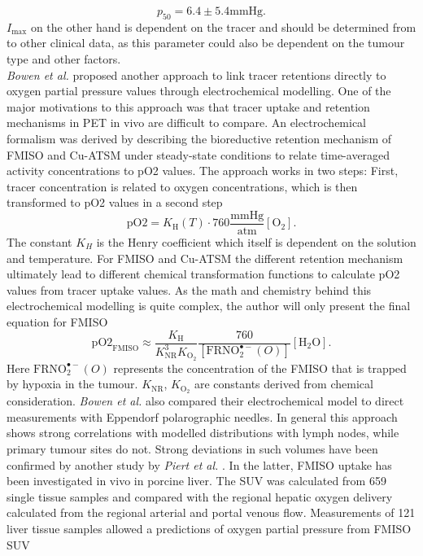 \begin{equation}
p_\mathrm{50} = 6.4 \pm 5.4 \mathrm{mmHg}.
\end{equation}
$I_\mathrm{max}$ on the other hand is dependent on the tracer and should be determined from to other clinical data, as this parameter could also be dependent on the tumour type and other factors.\\\textit{Bowen et al.} \cite{pmid21843774} proposed another approach to link tracer retentions directly to oxygen partial pressure values through electrochemical modelling. One of the major motivations to this approach was that tracer uptake and retention mechanisms in PET in vivo are difficult to compare. An electrochemical formalism was derived by describing the bioreductive retention mechanism of FMISO and Cu-ATSM under steady-state conditions to relate time-averaged activity concentrations to pO2 values. The approach works in two steps: First, tracer concentration is related to oxygen concentrations, which is then transformed to pO2 values in a second step
\begin{equation}
\mathrm{pO2} = K_\mathrm{H}(T)\cdot 760 \frac{\mathrm{mmHg}}{\mathrm{atm}}[\mathrm{O}_2].
\end{equation}
The constant $K_H$ is the Henry coefficient which itself is dependent on the solution and temperature.  For FMISO and Cu-ATSM the different retention mechanism ultimately lead to different chemical transformation functions to calculate pO2 values from tracer uptake values. As the math and chemistry behind this electrochemical modelling is quite complex, the author will only present the final equation for FMISO
\begin{equation}
\mathrm{pO2}_\mathrm{FMISO} \approx \frac{K_\mathrm{H}}{K_\mathrm{NR}^3K_{\mathrm{O}_2}}\frac{760}{[\mathrm{FRNO}_2^{\bullet -}(O)]}[\mathrm{H}_2\mathrm{O}].
\end{equation}
Here $\mathrm{FRNO}_2^{\bullet -}(O)$ represents the concentration of the FMISO that is trapped by hypoxia in the tumour. $K_\mathrm{NR}$, $K_{\mathrm{O}_2}$ are constants derived from chemical consideration. \textit{Bowen et al.} also compared their electrochemical model to direct measurements with Eppendorf polarographic needles. In general this approach shows strong correlations with modelled distributions with lymph nodes, while primary tumour sites do not. Strong deviations in such volumes have been confirmed by another study by \textit{Piert et al.} \cite{pmid11150699}. In the latter, FMISO uptake has been investigated in vivo in porcine liver. The SUV was calculated from 659 single tissue samples and compared with the regional hepatic oxygen delivery calculated from the regional arterial and portal venous flow. Measurements of 121 liver tissue samples allowed a predictions of oxygen partial pressure from FMISO SUV

